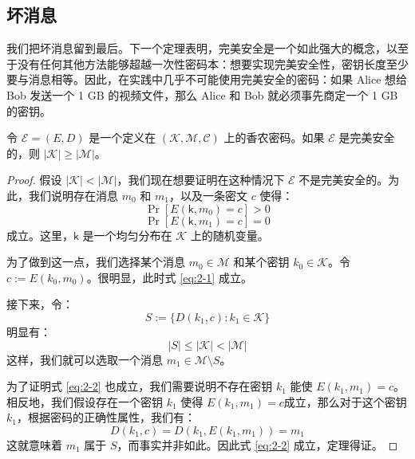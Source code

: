 \subsection{坏消息}

我们把坏消息留到最后。下一个定理表明，完美安全是一个如此强大的概念，以至于没有任何其他方法能够超越一次性密码本：想要实现完美安全性，密钥长度至少要与消息相等。因此，在实践中几乎不可能使用完美安全的密码：如果 Alice 想给 Bob 发送一个 1 GB 的视频文件，那么 Alice 和 Bob 就必须事先商定一个 1 GB 的密钥。

\begin{theorem}[香农定理]\label{theo:2-5}
令 $\mathcal{E}=(E,D)$ 是一个定义在 $(\mathcal{K},\mathcal{M},\mathcal{C})$ 上的香农密码。如果 $\mathcal{E}$ 是完美安全的，则 $|\mathcal{K}|\geq|\mathcal{M}|$。
\end{theorem}

\begin{proof}
假设 $|\mathcal{K}|<|\mathcal{M}|$，我们现在想要证明在这种情况下 $\mathcal{E}$ 不是完美安全的。为此，我们说明存在消息 $m_0$ 和 $m_1$，以及一条密文 $c$ 使得：
\begin{equation}\label{eq:2-1}
\Pr[E(\mathsf{k},m_0)=c]>0
\end{equation}
\begin{equation}\label{eq:2-2}
\Pr[E(\mathsf{k},m_1)=c]=0
\end{equation}
成立。这里，$\mathsf{k}$ 是一个均匀分布在 $\mathcal{K}$ 上的随机变量。

为了做到这一点，我们选择某个消息 $m_0\in\mathcal{M}$ 和某个密钥 $k_0\in\mathcal{K}$。令 $c:=E(k_0,m_0)$。很明显，此时式 \ref{eq:2-1} 成立。

接下来，令：
$$
S:=\{D(k_1,c):k_1\in\mathcal{K}\}
$$
明显有：
$$
 |S|\leq|\mathcal{K}|<|\mathcal{M}|
$$
这样，我们就可以选取一个消息 $m_1\in \mathcal{M}\setminus S$。

为了证明式 \ref{eq:2-2} 也成立，我们需要说明不存在密钥 $k_1$ 能使 $E(k_1,m_1) = c$。相反地，我们假设存在一个密钥 $k_1$ 使得 $E(k_1,m_1) = c$成立，那么对于这个密钥 $k_1$，根据密码的正确性属性，我们有：
$$
D(k_1,c)=D(k_1,E(k_1,m_1))=m_1
$$
这就意味着 $m_1$ 属于 $S$，而事实并非如此。因此式 \ref{eq:2-2} 成立，定理得证。
\end{proof}